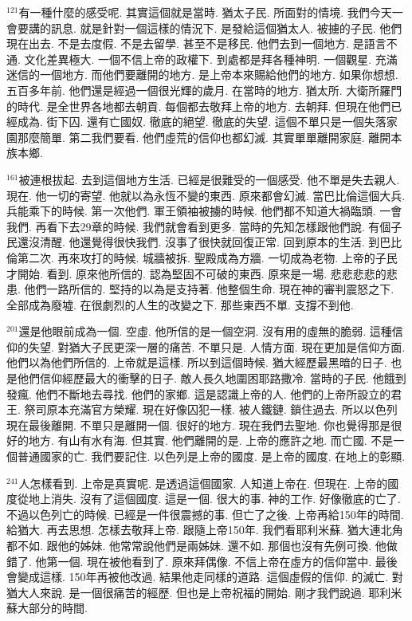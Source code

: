 \documentclass{book}
\begin{document}
$^{121}$有一種什麼的感受呢.
其實這個就是當時.
猶太子民.
所面對的情境.
我們今天一會要講的訊息.
就是針對一個這樣的情況下.
是發給這個猶太人.
被擄的子民.
他們現在出去.
不是去度假.
不是去留學.
甚至不是移民.
他們去到一個地方.
是語言不通.
文化差異極大.
一個不信上帝的政權下.
到處都是拜各種神明.
一個觀星.
充滿迷信的一個地方.
而他們要離開的地方.
是上帝本來賜給他們的地方.
如果你想想.
五百多年前.
他們還是經過一個很光輝的歲月.
在當時的地方.
猶太所.
大衛所羅門的時代.
是全世界各地都去朝貢.
每個都去敬拜上帝的地方.
去朝拜.
但現在他們已經成為.
街下囚.
還有亡國奴.
徹底的絕望.
徹底的失望.
這個不單只是一個失落家園那麼簡單.
第二我們要看.
他們虛荒的信仰也都幻滅.
其實單單離開家庭.
離開本族本鄉.

$^{161}$被連根拔起.
去到這個地方生活.
已經是很難受的一個感受.
他不單是失去親人.
現在.
他一切的寄望.
他就以為永恆不變的東西.
原來都會幻滅.
當巴比倫這個大兵.
兵能乘下的時候.
第一次他們.
軍王領袖被擄的時候.
他們都不知道大禍臨頭.
一會我們.
再看下去29章的時候.
我們就會看到更多.
當時的先知怎樣跟他們說.
有個子民還沒清醒.
他還覺得很快我們.
沒事了很快就回復正常.
回到原本的生活.
到巴比倫第二次.
再來攻打的時候.
城牆被拆.
聖殿成為方牆.
一切成為老物.
上帝的子民才開始.
看到.
原來他所信的.
認為堅固不可破的東西.
原來是一場.
悲悲悲悲的悲患.
他們一路所信的.
堅持的以為是支持著.
他整個生命.
現在神的審判震怒之下.
全部成為廢墟.
在很劇烈的人生的改變之下.
那些東西不單.
支撐不到他.

$^{201}$還是他眼前成為一個.
空虛.
他所信的是一個空洞.
沒有用的虛無的脆弱.
這種信仰的失望.
對猶大子民更深一層的痛苦.
不單只是.
人情方面.
現在更加是信仰方面.
他們以為他們所信的.
上帝就是這樣.
所以到這個時候.
猶大經歷最黑暗的日子.
也是他們信仰經歷最大的衝擊的日子.
敵人長久地圍困耶路撒冷.
當時的子民.
他餓到發瘋.
他們不斷地去尋找.
他們的家鄉.
這是認識上帝的人.
他們的上帝所設立的君王.
祭司原本充滿官方榮耀.
現在好像囚犯一樣.
被人鐵鏈.
鎖住過去.
所以以色列現在最後離開.
不單只是離開一個.
很好的地方.
現在我們去聖地.
你也覺得那是很好的地方.
有山有水有海.
但其實.
他們離開的是.
上帝的應許之地.
而亡國.
不是一個普通國家的亡.
我們要記住.
以色列是上帝的國度.
是上帝的國度.
在地上的彰顯.

$^{241}$人怎樣看到.
上帝是真實呢.
是透過這個國家.
人知道上帝在.
但現在.
上帝的國度從地上消失.
沒有了這個國度.
這是一個.
很大的事.
神的工作.
好像徹底的亡了.
不過以色列亡的時候.
已經是一件很震撼的事.
但亡了之後.
上帝再給150年的時間.
給猶大.
再去思想.
怎樣去敬拜上帝.
跟隨上帝150年.
我們看耶利米蘇.
猶大連北角都不如.
跟他的姊妹.
他常常說他們是兩姊妹.
還不如.
那個也沒有先例可換.
他做錯了.
他第一個.
現在被他看到了.
原來拜偶像.
不信上帝在虛方的信仰當中.
最後會變成這樣.
150年再被他改過.
結果他走同樣的道路.
這個虛假的信仰.
的滅亡.
對猶大人來說.
是一個很痛苦的經歷.
但也是上帝祝福的開始.
剛才我們說過.
耶利米蘇大部分的時間.
\end{document}
